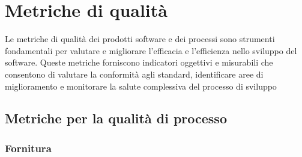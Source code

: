 \section{Metriche di qualità}
Le metriche di qualità dei prodotti software e dei processi sono strumenti fondamentali per valutare e migliorare l'efficacia e l'efficienza nello sviluppo del software. Queste metriche forniscono indicatori oggettivi e misurabili che consentono di valutare la conformità agli standard, identificare aree di miglioramento e monitorare la salute complessiva del processo di sviluppo

\subsection{Metriche per la qualità di processo}

\subsubsection{Fornitura}
